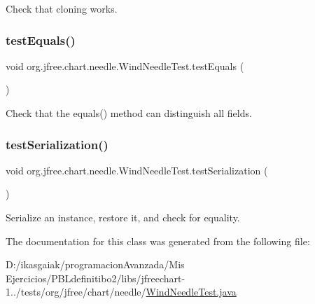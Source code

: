 Check that cloning works. \mbox{\label{classorg_1_1jfree_1_1chart_1_1needle_1_1_wind_needle_test_a04deb5268361e32474434a9eeb0656c6}} 
\subsubsection{\texorpdfstring{test\+Equals()}{testEquals()}}
{\footnotesize\ttfamily void org.\+jfree.\+chart.\+needle.\+Wind\+Needle\+Test.\+test\+Equals (\begin{DoxyParamCaption}{ }\end{DoxyParamCaption})}

Check that the equals() method can distinguish all fields. \mbox{\label{classorg_1_1jfree_1_1chart_1_1needle_1_1_wind_needle_test_a950c80c48263d136d51eaf2f3f96d2e9}} 
\subsubsection{\texorpdfstring{test\+Serialization()}{testSerialization()}}
{\footnotesize\ttfamily void org.\+jfree.\+chart.\+needle.\+Wind\+Needle\+Test.\+test\+Serialization (\begin{DoxyParamCaption}{ }\end{DoxyParamCaption})}

Serialize an instance, restore it, and check for equality. 

The documentation for this class was generated from the following file\+:\begin{DoxyCompactItemize}
\item 
D\+:/ikasgaiak/programacion\+Avanzada/\+Mis Ejercicios/\+P\+B\+Ldefinitibo2/libs/jfreechart-\/1../tests/org/jfree/chart/needle/\mbox{\hyperlink{_wind_needle_test_8java}{Wind\+Needle\+Test.\+java}}\end{DoxyCompactItemize}

